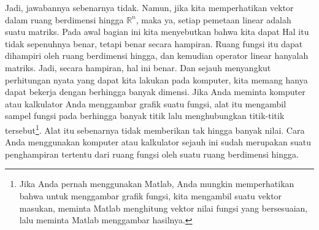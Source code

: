 Jadi, jawabannya sebenarnya tidak. Namun, jika kita memperhatikan vektor dalam
ruang berdimensi hingga ${\mathbb R}^n$, maka ya, setiap pemetaan linear adalah suatu
matriks.
Pada awal bagian ini kita menyebutkan bahwa kita dapat
 Hal itu tidak sepenuhnya benar, tetapi
benar
secara hampiran. Ruang fungsi  itu dapat
dihampiri oleh ruang berdimensi hingga, dan kemudian operator linear
hanyalah matriks. Jadi, secara hampiran, hal ini benar. Dan sejauh menyangkut perhitungan nyata
yang dapat kita lakukan pada komputer, kita memang hanya dapat bekerja dengan
berhingga banyak dimensi. Jika Anda meminta komputer atau kalkulator Anda
menggambar grafik suatu fungsi,
alat itu mengambil sampel fungsi pada berhingga banyak titik lalu
menghubungkan titik-titik tersebut\footnote{Jika Anda pernah menggunakan Matlab, Anda mungkin
memperhatikan bahwa untuk menggambar grafik fungsi, kita mengambil suatu vektor masukan, meminta Matlab
menghitung vektor nilai fungsi yang bersesuaian, lalu meminta
Matlab menggambar hasilnya.}.
Alat itu sebenarnya tidak memberikan tak hingga banyak nilai.
Cara Anda menggunakan komputer atau kalkulator sejauh ini
sudah merupakan suatu penghampiran tertentu dari ruang fungsi oleh suatu
ruang berdimensi hingga.

\medskip

